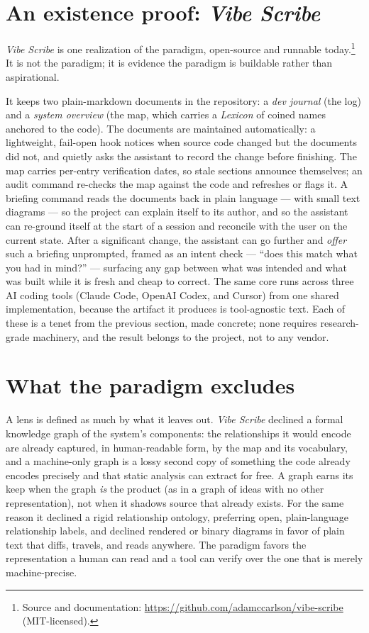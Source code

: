\documentclass[11pt]{article}
\newcommand{\vs}{\textit{Vibe Scribe}}
\begin{document}
\section{An existence proof: \vs{}}

\vs{} is one realization of the paradigm, open-source and runnable today.\footnote{Source and
documentation: \url{https://github.com/adamccarlson/vibe-scribe} (MIT-licensed).} It is not the
paradigm; it is evidence the paradigm is buildable rather than aspirational.

It keeps two plain-markdown documents in the repository: a \emph{dev journal} (the log) and a
\emph{system overview} (the map, which carries a \emph{Lexicon} of coined names anchored to the
code). The documents are maintained automatically: a lightweight, fail-open hook notices when source
code changed but the documents did not, and quietly asks the assistant to record the change before
finishing. The map carries per-entry verification dates, so stale sections announce themselves; an
audit command re-checks the map against the code and refreshes or flags it. A briefing command reads
the documents back in plain language --- with small text diagrams --- so the project can explain
itself to its author, and so the assistant can re-ground itself at the start of a session and
reconcile with the user on the current state. After a significant change, the assistant can go
further and \emph{offer} such a briefing unprompted, framed as an intent check --- ``does this match
what you had in mind?'' --- surfacing any gap between what was intended and what was built while it is
fresh and cheap to correct. The same core runs across three AI coding tools
(Claude Code, OpenAI Codex, and Cursor) from one shared implementation, because the artifact it
produces is tool-agnostic text. Each of these is a tenet from the previous section, made concrete;
none requires research-grade machinery, and the result belongs to the project, not to any vendor.

\section{What the paradigm excludes}

A lens is defined as much by what it leaves out. \vs{} declined a formal knowledge graph of the
system's components: the relationships it would encode are already captured, in human-readable form,
by the map and its vocabulary, and a machine-only graph is a lossy second copy of something the code
already encodes precisely and that static analysis can extract for free. A graph earns its keep when
the graph \emph{is} the product (as in a graph of ideas with no other representation), not when it
shadows source that already exists. For the same reason it declined a rigid relationship ontology,
preferring open, plain-language relationship labels, and declined rendered or binary diagrams in
favor of plain text that diffs, travels, and reads anywhere. The paradigm favors the representation a
human can read and a tool can verify over the one that is merely machine-precise.
\end{document}
